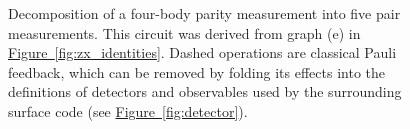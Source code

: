 \documentclass[onecolumn,unpublished,a4paper]{quantumarticle}
\theoremstyle{definition}
\theoremstyle{definition}
\theoremstyle{definition}
\newcommand{\fig}[1]{\hyperref[fig:#1]{Figure~\ref*{fig:#1}}}
\begin{document}
\begin{figure}
    \centering
    \caption{
        Decomposition of a four-body parity measurement into five pair measurements.
        This circuit was derived from graph (e) in \fig{zx_identities}.
        Dashed operations are classical Pauli feedback, which can be removed by folding its effects into the definitions of detectors and observables used by the surrounding surface code (see \fig{detector}).
}
\end{figure}
\end{document}

